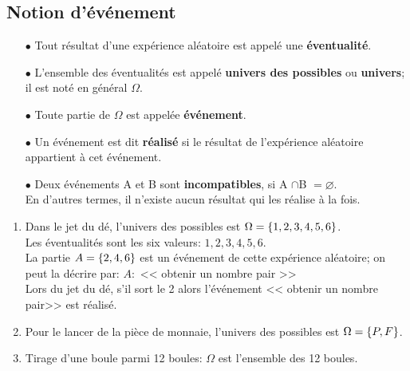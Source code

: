 \subsection{Notion d'événement}
\begin{definition}
\begin{itemize}

\item[$  \bullet$]
Tout résultat d'une expérience aléatoire est appelé une \textbf{ éventualité}. 
\item [$  \bullet$] L'ensemble des éventualités est appelé \textbf{univers des possibles} ou \textbf{univers}; il est noté en général $ \Omega $. 
\item[$  \bullet$] Toute partie de $ \Omega $ est appelée \textbf{ événement}.
\item[$  \bullet$] Un événement est dit \textbf{réalisé} si le résultat de l'expérience aléatoire appartient à cet événement.
\item[$  \bullet$] Deux événements A et B  sont \textbf{  incompatibles},  si A $ \cap $B $ = \varnothing$.\\ En d'autres termes, il n'existe aucun résultat qui les réalise à la fois.
\end{itemize}
\end{definition}

\begin{example}
\begin{enumerate}
\item Dans le jet du dé, l'univers des possibles est $ \Omega =\left\{1,2,3,4,5,6\right\} $.\\ 
Les éventualités sont  les six valeurs: $ 1,2,3,4,5,6 $.\\
 La partie $ A=\left\{2,4,6\right\} $ est un événement de cette expérience aléatoire; on peut la décrire par: $ A :$  <<  obtenir  un nombre pair  >>\\
 Lors du jet du dé, s'il sort  le 2 alors l'événement <<  obtenir  un nombre pair>>  est réalisé.
  \item Pour le lancer de la pièce de monnaie, l'univers des possibles est $ \Omega =\left\{P,F\right\} $.
  \item   Tirage d'une boule parmi 12 boules: $ \Omega$  est l'ensemble des 12 boules.
\end{enumerate}
\end{example}


\bigskip

